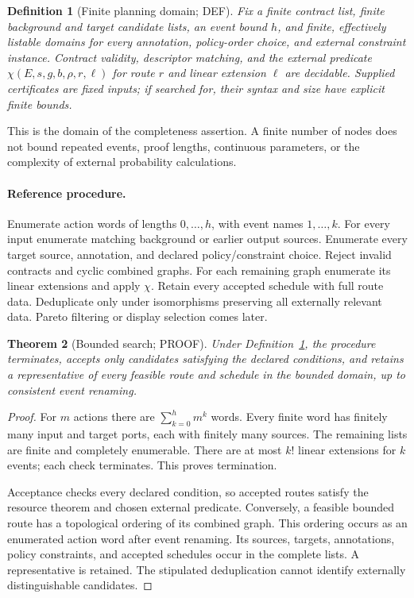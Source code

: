 \documentclass[11pt,a4paper]{article}
\newtheorem{definition}{Definition}[section]
\newtheorem{theorem}[definition]{Theorem}
\theoremstyle{remark}
\newcommand{\status}[1]{\textsf{\small #1}}
\begin{document}
\begin{definition}[Finite planning domain; \status{DEF}]\label{def:finite}
Fix a finite contract list, finite background and target candidate lists,
an event bound \(h\), and finite, effectively listable domains for every
annotation, policy-order choice, and external constraint instance.
Contract validity, descriptor matching, and the external predicate
\(\chi(E,s,g,b,\rho,r,\ell)\) for route \(r\) and linear extension \(\ell\)
are decidable. Supplied certificates are fixed inputs; if searched for,
their syntax and size have explicit finite bounds.
\end{definition}
This is the domain of the completeness assertion. A finite number of nodes
does not bound repeated events, proof lengths, continuous parameters,
or the complexity of external probability calculations.

\paragraph{Reference procedure.}
Enumerate action words of lengths \(0,\ldots,h\), with event names \(1,\ldots,k\).
For every input enumerate matching background or earlier output sources.
Enumerate every target source, annotation, and declared policy/constraint choice.
Reject invalid contracts and cyclic combined graphs. For each remaining graph
enumerate its linear extensions and apply \(\chi\). Retain every accepted
schedule with full route data. Deduplicate only under isomorphisms preserving
all externally relevant data. Pareto filtering or display selection comes later.

\begin{theorem}[Bounded search; \status{PROOF}]\label{thm:search}
Under Definition~\ref{def:finite}, the procedure terminates, accepts only
candidates satisfying the declared conditions, and retains a representative
of every feasible route and schedule in the bounded domain, up to consistent
event renaming.
\end{theorem}
\begin{proof}
For \(m\) actions there are \(\sum_{k=0}^h m^k\) words.
Every finite word has finitely many input and target ports, each with finitely
many sources. The remaining lists are finite and completely enumerable.
There are at most \(k!\) linear extensions for \(k\) events; each check
terminates. This proves termination.

Acceptance checks every declared condition, so accepted routes satisfy the
resource theorem and chosen external predicate. Conversely, a feasible bounded
route has a topological ordering of its combined graph. This ordering occurs
as an enumerated action word after event renaming. Its sources, targets,
annotations, policy constraints, and accepted schedules occur in the complete
lists. A representative is retained. The stipulated deduplication cannot
identify externally distinguishable candidates.
\end{proof}
\end{document}
